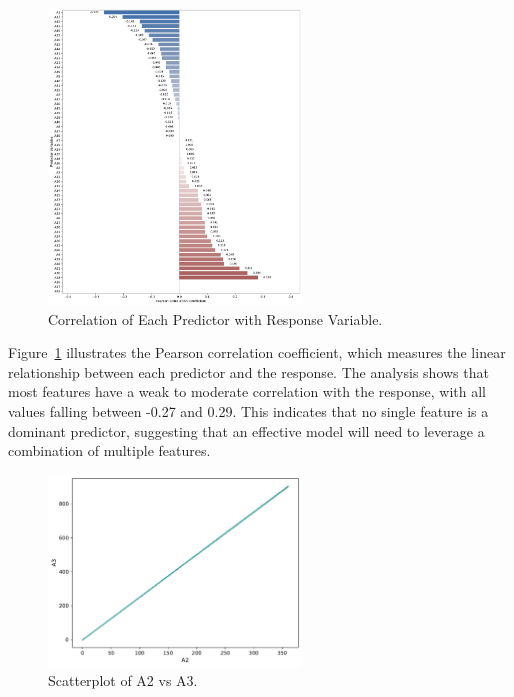 \documentclass[11pt]{report}
\begin{document}
\begin{figure}[H]
    \centering
    \includegraphics[width=0.6\textwidth]{images/correlation_with_T.pdf}
    \caption{Correlation of Each Predictor with Response Variable.}
    \label{fig:correlation_with_T}
\end{figure}

Figure~\ref{fig:correlation_with_T} illustrates the Pearson correlation coefficient, which measures the linear relationship between each predictor and the response. The analysis shows that most features have a weak to moderate correlation with the response, with all values falling between -0.27 and 0.29. This indicates that no single feature is a dominant predictor, suggesting that an effective model will need to leverage a combination of multiple features.

\begin{figure}[H]
    \centering
    \includegraphics[width=0.6\textwidth]{images/A2_vs_A3_scatterplot.pdf}
    \caption{Scatterplot of A2 vs A3.}
    \label{fig:A2_vs_A3_scatterplot}
\end{figure}
\end{document}
